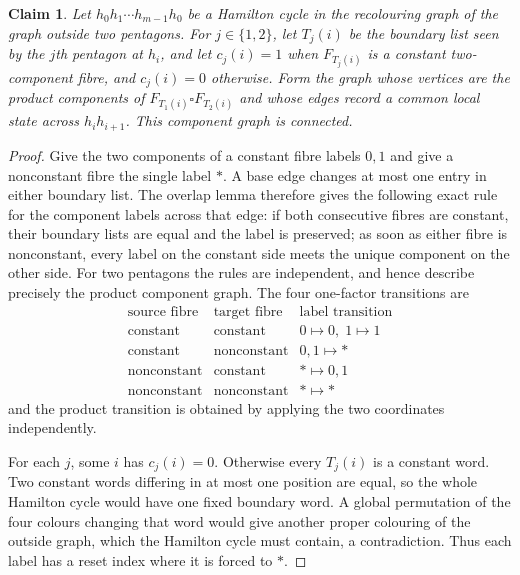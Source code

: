 \documentclass[11pt]{article}
\newtheorem{claim}{Claim}
\theoremstyle{remark}
\numberwithin{equation}{section}
\numberwithin{table}{section}
\begin{document}
\begin{claim}\label{lem:pentagon-component-graph}
Let $h_0h_1\cdots h_{m-1}h_0$ be a Hamilton cycle in the
recolouring graph of the graph outside two pentagons.  For
$j\in\{1,2\}$, let $T_j(i)$ be the boundary list seen by the $j$th
pentagon at $h_i$, and let $c_j(i)=1$ when $F_{T_j(i)}$ is a constant
two-component fibre, and $c_j(i)=0$ otherwise.  Form the graph whose
vertices are the product components of
$F_{T_1(i)}\square F_{T_2(i)}$ and whose edges record a common local
state across $h_ih_{i+1}$.  This component graph is connected.
\end{claim}
\begin{proof}
Give the two components of a constant fibre labels $0,1$ and give a
nonconstant fibre the single label $\ast$.  A base edge changes at
most one entry in either boundary list.  The overlap lemma therefore
gives the following exact rule for the component labels across that
edge: if both consecutive fibres are constant, their boundary lists
are equal and the label is preserved; as soon as either fibre is
nonconstant, every label on the constant side meets the unique
component on the other side.  For two pentagons the rules are
independent, and hence describe precisely the product component graph.
The four one-factor transitions are
\[
\begin{array}{c|c|c}
\text{source fibre}&\text{target fibre}&\text{label transition}\\ \hline
\text{constant}&\text{constant}&0\mapsto0,\;1\mapsto1\\
\text{constant}&\text{nonconstant}&0,1\mapsto\ast\\
\text{nonconstant}&\text{constant}&\ast\mapsto0,1\\
\text{nonconstant}&\text{nonconstant}&\ast\mapsto\ast
\end{array}
\]
and the product transition is obtained by applying the two coordinates
independently.

For each $j$, some $i$ has $c_j(i)=0$.  Otherwise every $T_j(i)$ is a
constant word.  Two constant words differing in at most one position
are equal, so the whole Hamilton cycle would have one fixed boundary
word.  A global permutation of the four colours changing that word
would give another proper colouring of the outside graph, which the
Hamilton cycle must contain, a contradiction.  Thus each label has a
reset index where it is forced to $\ast$.


\end{proof}
\end{document}
